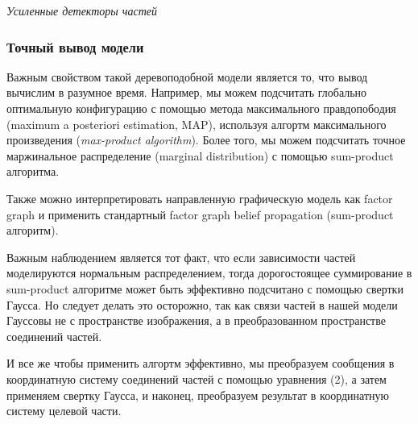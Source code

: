 \emph{Усиленные детекторы частей}

\subsubsection{Точный вывод модели}

Важным свойством такой деревоподобной модели является то, что вывод вычислим в разумное время. Например, мы можем подсчитать глобально оптимальную конфигурацию с помощью метода максимального правдопободия (maximum a posteriori estimation, MAP), используя алгортм максимального произведения (\emph{max-product algorithm}). Более того, мы можем подсчитать точное маржинальное распределение (marginal distribution) с помощью sum-product алгоритма.

Также можно интерпретировать направленную графическую модель как factor graph и применить стандартный factor graph belief propagation (sum-product алгоритм).

Важным наблюдением является тот факт, что если зависимости частей моделируются нормальным распределением, тогда дорогостоящее суммирование в sum-product алгоритме может быть эффективно подсчитано с помощью свертки Гаусса. Но следует делать это осторожно, так как связи частей в нашей модели Гауссовы не с пространстве изображения, а в преобразованном пространстве соединений частей.

И все же чтобы применить алгортм эффективно, мы преобразуем сообщения в координатную систему соединений частей с помощью уравнения (2), а затем применяем свертку Гаусса, и наконец, преобразуем результат в координатную систему целевой части.

\newpage

